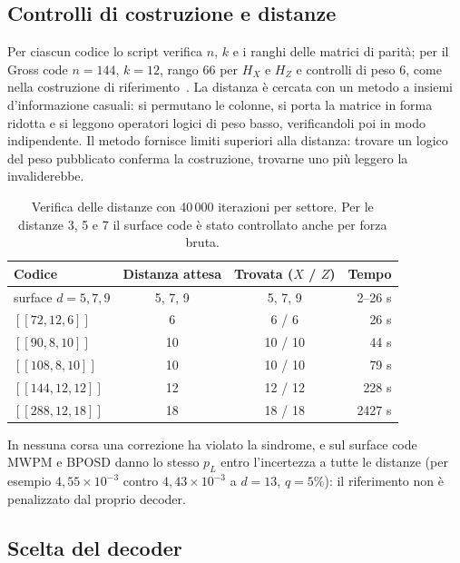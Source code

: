 \begin{onehalfspace}
\subsection{Controlli di costruzione e distanze}
\label{app:gross_controlli}

Per ciascun codice lo script verifica $n$, $k$ e i ranghi delle matrici
di parità; per il Gross code $n = 144$, $k = 12$, rango 66 per $H_X$ e
$H_Z$ e controlli di peso 6, come nella costruzione di
riferimento~\cite{bravyi2024}. La distanza è cercata con un metodo a
insiemi d'informazione casuali: si permutano le colonne, si porta la
matrice in forma ridotta e si leggono operatori logici di peso basso,
verificandoli poi in modo indipendente. Il metodo fornisce limiti
superiori alla distanza: trovare un logico del peso pubblicato conferma
la costruzione, trovarne uno più leggero la invaliderebbe.

\begin{table}[H]
\centering
\small
\begin{tabular}{@{}lccr@{}}
\toprule
\textbf{Codice} & \textbf{Distanza attesa} & \textbf{Trovata ($X$ / $Z$)} & \textbf{Tempo} \\
\midrule
surface $d = 5, 7, 9$ & 5, 7, 9 & 5, 7, 9 & 2--26 s \\
$[[72,12,6]]$ & 6 & 6 / 6 & 26 s \\
$[[90,8,10]]$ & 10 & 10 / 10 & 44 s \\
$[[108,8,10]]$ & 10 & 10 / 10 & 79 s \\
$[[144,12,12]]$ & 12 & 12 / 12 & 228 s \\
$[[288,12,18]]$ & 18 & 18 / 18 & 2427 s \\
\bottomrule
\end{tabular}
\caption[Distanze dei codici bivariate bicycle]{Verifica delle distanze
con 40\,000 iterazioni per settore. Per le distanze 3, 5 e 7 il surface
code è stato controllato anche per forza bruta.}
\label{tab:app_gross_distanze}
\end{table}

In nessuna corsa una correzione ha violato la sindrome, e sul surface
code \ac{MWPM} e \ac{BPOSD} danno lo stesso $p_L$ entro l'incertezza a
tutte le distanze (per esempio $4{,}55\times10^{-3}$ contro
$4{,}43\times10^{-3}$ a $d = 13$, $q = 5\%$): il riferimento non è
penalizzato dal proprio decoder.

\subsection{Scelta del decoder}
\label{app:gross_decoder}


\end{onehalfspace}
